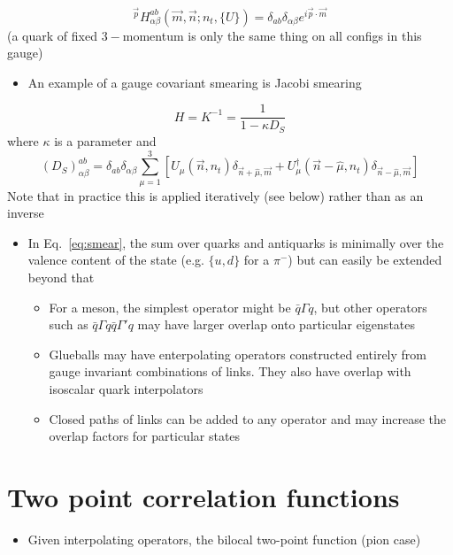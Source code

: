 \begin{equation}
     {}^{\vec{p}}H_{\alpha \beta}^{a b}(\vec{m}, \vec{n}; n_t, \{U\}) = \delta_{a b} \delta_{\alpha \beta} e^{i \vec{p} \cdot \vec{m}}
\end{equation}
(a quark of fixed $3-$momentum is only the same thing on all configs in this gauge)
\begin{itemize}
    \item An example of a gauge covariant smearing is Jacobi smearing
\end{itemize}
\begin{equation}
    H = K^{-1} = \frac{1}{1 - \kappa D_S}
\end{equation}
where $\kappa$ is a parameter and
\begin{equation}
    (D_S)_{\alpha \beta}^{ab} = \delta_{ab} \delta_{\alpha \beta} \sum_{\mu = 1}^3 [ U_\mu (\vec{n}, n_t) \delta_{\vec{n} + \hat{\mu}, \vec{m}} + U^\dagger_\mu(\vec{n} - \hat{\mu}, n_t) \delta_{\vec{n} - \hat{\mu}, \vec{m}}]
\end{equation}
Note that in practice this is applied iteratively (see below) rather than as an inverse
\begin{itemize}
    \item In Eq.~\eqref{eq:smear}, the sum over quarks and antiquarks is minimally over the valence content of the state (e.g. $\{ u,d\}$ for a $\pi^-$) but can easily be extended beyond that
    \begin{itemize}
        \item For a meson, the simplest operator might be $\bar{q} \Gamma q$, but other operators such as $\bar{q} \Gamma q \bar{q} \Gamma' q$ may have larger overlap onto particular eigenstates
        \item Glueballs may have enterpolating operators constructed entirely from gauge invariant combinations of links. They also have overlap with isoscalar quark interpolators
        \item Closed paths of links can be added to any operator and may increase the overlap factors for particular states
    \end{itemize}
\end{itemize}
\section{Two point correlation functions}
\begin{itemize}
    \item Given interpolating operators, the bilocal two-point function (pion case)
\end{itemize}

